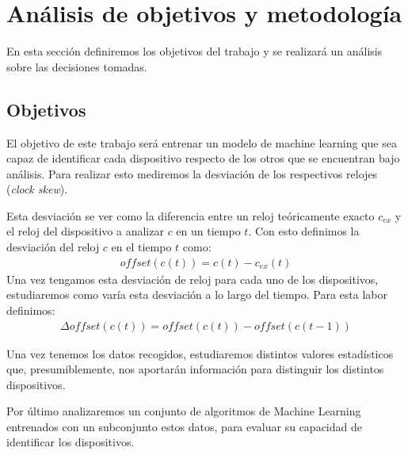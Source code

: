 
\lstset{frame=single,basicstyle=\ttfamily\small}

\chapter{Análisis de objetivos y metodología} \label{chap:meto}

En esta sección definiremos los objetivos del trabajo y se realizará un análisis sobre las decisiones tomadas.

\section{Objetivos}

El objetivo de este trabajo será entrenar un modelo de machine learning que sea capaz de identificar cada dispositivo respecto de los otros que se encuentran bajo análisis. Para realizar esto mediremos la desviación de los respectivos relojes (\textit{clock skew}).

Esta desviación se ver como la diferencia entre un reloj teóricamente exacto $c_{ex}$ y el reloj del dispositivo a analizar $c$ en un tiempo $t$. Con esto definimos la desviación del reloj $c$ en el tiempo $t$ como:
\begin{gather*}
    offset(c(t)) = c(t) - c_{ex}(t)
\end{gather*}
Una vez tengamos esta desviación de reloj para cada uno de los dispositivos, estudiaremos como varía esta desviación a lo largo del tiempo. Para esta labor definimos:
\begin{gather*}
    \Delta offset\left(c\left(t\right)\right) = offset\left(c\left(t\right)\right) - offset\left(c\left(t - 1\right)\right)
\end{gather*}

Una vez tenemos los datos recogidos, estudiaremos distintos valores estadísticos que, presumiblemente, nos aportarán información para distinguir los distintos dispositivos.

Por último analizaremos un conjunto de algoritmos de Machine Learning entrenados con un subconjunto estos datos, para evaluar su capacidad de identificar los dispositivos.
